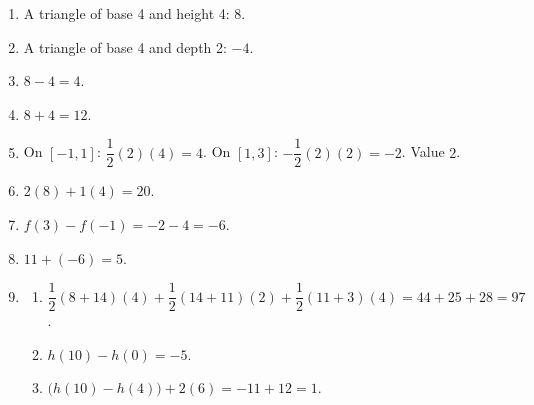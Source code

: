 \documentclass[11pt]{article}
\begin{document}
\newpage
\begin{solbox}
\begin{enumerate}[leftmargin=*,itemsep=4pt]
  \item A triangle of base 4 and height 4: $8$.
  \item A triangle of base 4 and depth 2: $-4$.
  \item $8-4=4$.
  \item $8+4=12$.
  \item On $[-1,1]$: $\dfrac12(2)(4)=4$. On $[1,3]$: $-\dfrac12(2)(2)=-2$. Value $2$.
  \item $2(8)+1(4)=20$.
  \item $f(3)-f(-1)=-2-4=-6$.
  \item $11+(-6)=5$.
  \item \begin{enumerate}[label=(\alph*),leftmargin=*,itemsep=3pt]
    \item $\dfrac12(8+14)(4)+\dfrac12(14+11)(2)+\dfrac12(11+3)(4)=44+25+28=97$.
    \item $h(10)-h(0)=-5$.
    \item $\big(h(10)-h(4)\big)+2(6)=-11+12=1$.
  \end{enumerate}
\end{enumerate}
\end{solbox}
\end{document}
